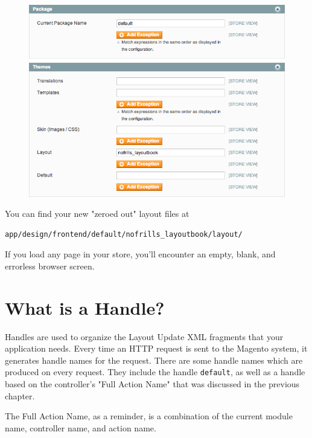 \documentclass[oneside]{book}
\begin{document}
\begin{figure}[htb]
\begin{center}
\leavevmode
\includegraphics[width=1\textwidth]{images/chapter3/config-package.png}
\end{center}
\caption{}
\end{figure}


You can find your new "zeroed out" layout files at

\begin{lstlisting}
app/design/frontend/default/nofrills_layoutbook/layout/

\end{lstlisting}


If you load any page in your store, you'll encounter an empty, blank, and errorless browser screen.

\section{What is a Handle?}

Handles are used to organize the Layout Update XML fragments that your application needs.  Every time an HTTP request is sent to the Magento system, it generates handle names for the request.  There are some handle names which are produced on every request.  They include the handle \footnotesize\texttt{default}\normalsize, as well as a handle based on the controller's "Full Action Name" that was discussed in the previous chapter.

The Full Action Name, as a reminder, is a combination of the current module name, controller name, and action name.
\end{document}
